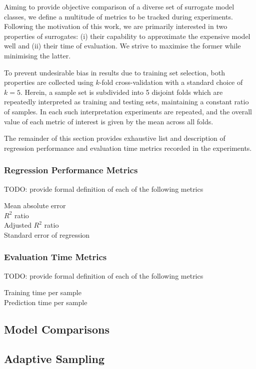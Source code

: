 Aiming to provide objective comparison of a diverse set of surrogate model
classes, we define a multitude of metrics to be tracked during experiments.
Following the motivation of this work, we are primarily interested in two
properties of surrogates: (i) their capability to approximate the expensive
model well and (ii) their time of evaluation. We strive to maximise the former
while minimising the latter.

To prevent undesirable bias in results due to training set selection, both
properties are collected using $k$-fold cross-validation with a standard choice
of $k=5$. Herein, a sample set is subdivided into 5 disjoint
folds which are repeatedly interpreted as training and testing sets, maintaining
a constant ratio of samples. In each such interpretation experiments are
repeated, and the overall value of each metric of interest is given by the mean
across all folds.

The remainder of this section provides exhaustive list and description of
regression performance and evaluation time metrics recorded in the experiments.

\subsubsection{Regression Performance Metrics}
\label{sec:perf-metrics}

TODO: provide formal definition of each of the following metrics

\begin{description}
	\item[Mean absolute error]
	\item[$R^2$ ratio]
	\item[Adjusted $R^2$ ratio]
	\item[Standard error of regression]
\end{description}


\subsubsection{Evaluation Time Metrics}
\label{sec:time-metrics}

TODO: provide formal definition of each of the following metrics

\begin{description}
	\item[Training time per sample]
	\item[Prediction time per sample]
\end{description}


\subsection{Model Comparisons}
\label{sec:model}


\subsection{Adaptive Sampling}
\label{sec:adaptive}

